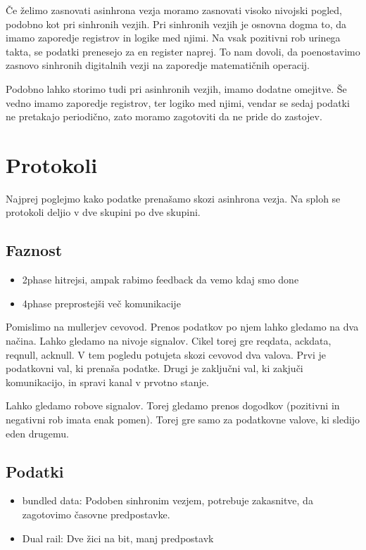 
Če želimo zasnovati asinhrona vezja moramo zasnovati visoko nivojski pogled, podobno kot pri sinhronih vezjih. Pri sinhronih vezjih je osnovna dogma to, da imamo zaporedje registrov in logike med njimi. Na vsak pozitivni rob urinega takta, se podatki prenesejo za en register naprej. To nam dovoli, da poenostavimo zasnovo sinhronih digitalnih vezji na zaporedje matematičnih operacij.

Podobno lahko storimo tudi pri asinhronih vezjih, imamo dodatne omejitve. Še vedno imamo zaporedje registrov, ter logiko med njimi, vendar se sedaj podatki ne pretakajo periodično, zato moramo zagotoviti da ne pride do zastojev.

\section{Protokoli} \label{a}

Najprej poglejmo kako podatke prenašamo skozi asinhrona vezja. Na sploh se protokoli deljio v dve skupini po dve skupini.

\subsection{Faznost} \label{b}

\begin{itemize}
	\item 2phase hitrejsi, ampak rabimo feedback da vemo kdaj smo done
	\item 4phase preprostejši več komunikacije
\end{itemize}

Pomislimo na mullerjev cevovod. Prenos podatkov po njem lahko gledamo na dva načina.
Lahko gledamo na nivoje signalov. Cikel torej gre reqdata, ackdata, reqnull, acknull. V tem pogledu potujeta skozi cevovod dva valova. Prvi je podatkovni val, ki prenaša podatke. Drugi je zaključni val, ki zakjuči komunikacijo, in spravi kanal v prvotno stanje.

Lahko gledamo robove signalov. Torej gledamo prenos dogodkov (pozitivni in negativni rob imata enak pomen). Torej gre samo za podatkovne valove, ki sledijo eden drugemu.


\subsection{Podatki} \label{b}

\begin{itemize}
	\item bundled data: Podoben sinhronim vezjem, potrebuje zakasnitve, da zagotovimo časovne predpostavke.
	\item Dual rail: Dve žici na bit, manj predpostavk
\end{itemize}

